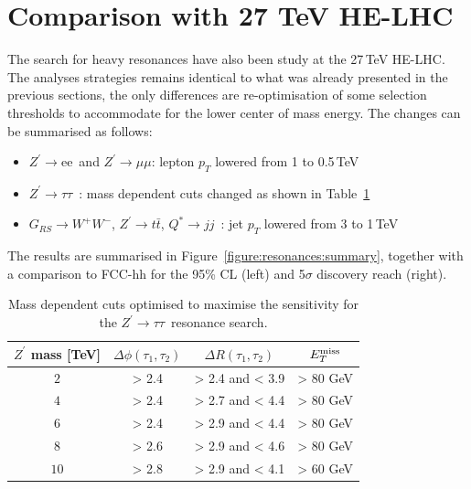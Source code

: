\documentclass[a4paper,11pt]{article}
\newcommand{\Zp}{\ensuremath{Z^{\prime}}}
\newcommand*{\Zptata}{\ensuremath{Z^{\prime}\rightarrow \tau\tau}}
\newcommand*{\Zpee}{\ensuremath{Z^{\prime}\rightarrow \text{ee}}}
\newcommand*{\Zpmumu}{\ensuremath{Z^{\prime}\rightarrow \mu\mu}}
\newcommand*{\Zptt}{\ensuremath{Z^{\prime} \rightarrow \ttbar}}
\newcommand*{\met}{\ensuremath{E_{T}^{\rm{miss}}}}
\newcommand*{\qjj}{\ensuremath{Q^{*} \rightarrow jj}}
\newcommand*{\rsg}{\ensuremath{G_{RS} \rightarrow W^+W^-}}
\newcommand*{\ttbar}{\ensuremath{t\bar{t}}}
\begin{document}
\section{Comparison with 27 TeV HE-LHC}
\label{sec:ana27tev}
The search for heavy resonances have also been study at the 27\,TeV HE-LHC. The analyses strategies remains identical to what was already presented in the previous sections, the only differences are re-optimisation of some selection thresholds to accommodate for the lower center of mass energy. The changes can be summarised as follows:
\begin{itemize}
\item \Zpee\ and \Zpmumu : lepton $p_T$ lowered from 1 to 0.5\,TeV
\item \Zptata\ : mass dependent cuts changed as shown in Table~\ref{tab:leptonicresonances:tautau27}
\item \rsg, \Zptt, \qjj\ : jet $p_T$ lowered from 3 to 1\,TeV
\end{itemize}
The results are summarised in Figure~\ref{figure:resonances:summary}, together with a comparison to FCC-hh for the 95\% CL (left) and 5$\sigma$ discovery reach (right).

\begin{table}[!htb]
   \centering
\begin{tabular}{c|c|c|c}
   $\Zp$ mass [TeV] &  $\Delta \phi(\tau_1, \tau_2)$&  $\Delta R(\tau_1, \tau_2)$ & $\met$\\
  \hline
  \hline
   $2$ & > 2.4 & > 2.4 and < 3.9 & > 80 GeV\\
   $4$ & > 2.4 & > 2.7 and < 4.4 & > 80 GeV\\
   $6$ & > 2.4 & > 2.9 and < 4.4 & > 80 GeV\\
   $8$ & > 2.6 & > 2.9 and < 4.6 & > 80 GeV\\
  $10$ & > 2.8 & > 2.9 and < 4.1 & > 60 GeV\\
  \end{tabular}
  \caption{Mass dependent cuts optimised to maximise the sensitivity for the \Zptata\ resonance search.}
  \label{tab:leptonicresonances:tautau27}
\end{table}
\end{document}
